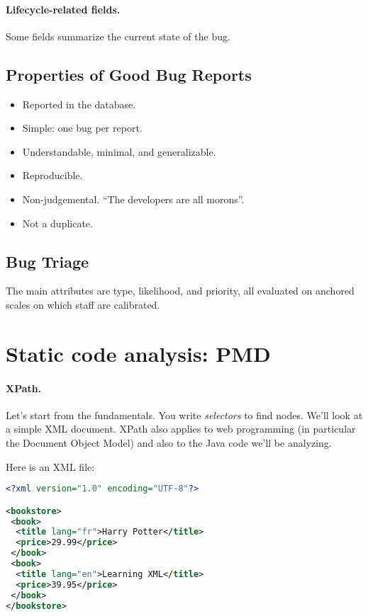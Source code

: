 \documentclass[11pt]{article}
\begin{document}
\paragraph{Lifecycle-related fields.} Some fields summarize the
current state of the bug.

\subsection*{Properties of Good Bug Reports}
\begin{itemize}[noitemsep]
\item Reported in the database.
\item Simple: one bug per report.
\item Understandable, minimal, and generalizable.
\item Reproducible.
\item Non-judgemental. ``The developers are all morons''.
\item Not a duplicate.
\end{itemize}

\subsection*{Bug Triage}

The main attributes are type, likelihood, and priority, all evaluated on anchored scales on which staff are calibrated.

\section*{Static code analysis: PMD}

\paragraph{XPath.} Let's start from the fundamentals. You write 
\emph{selectors} to find nodes. We'll look at a simple XML document.
XPath also applies to web programming (in particular the Document
Object Model) and also to the Java code we'll be analyzing.

Here is an XML file:
\begin{lstlisting}[language=XML]
<?xml version="1.0" encoding="UTF-8"?>

<bookstore>
 <book>
  <title lang="fr">Harry Potter</title>
  <price>29.99</price>
 </book>
 <book>
  <title lang="en">Learning XML</title>
  <price>39.95</price>
 </book>
</bookstore>
\end{lstlisting}
\end{document}
